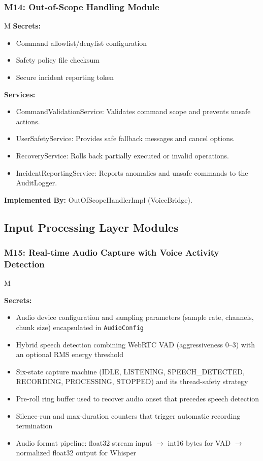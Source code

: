\documentclass[12pt, titlepage]{article}
\newcounter{mnum}
\newcommand{\mthemnum}{M\themnum}
\begin{document}
\subsubsection*{M14: Out-of-Scope Handling Module} \mthemnum\label{m14}
\textbf{Secrets:}
\begin{itemize}
  \item Command allowlist/denylist configuration
  \item Safety policy file checksum
  \item Secure incident reporting token
\end{itemize}
\textbf{Services:}
\begin{itemize}
  \item CommandValidationService: Validates command scope and prevents unsafe actions.
  \item UserSafetyService: Provides safe fallback messages and cancel options.
  \item RecoveryService: Rolls back partially executed or invalid operations.
  \item IncidentReportingService: Reports anomalies and unsafe commands to the AuditLogger.
\end{itemize}
\textbf{Implemented By:} OutOfScopeHandlerImpl (VoiceBridge).

\subsection*{Input Processing Layer Modules}

\subsubsection*{M15: Real-time Audio Capture with Voice Activity Detection} \mthemnum\label{m15}

\textbf{Secrets:}
\begin{itemize}
  \item Audio device configuration and sampling parameters (sample rate, channels, chunk size) encapsulated in \texttt{AudioConfig}
  \item Hybrid speech detection combining WebRTC VAD (aggressiveness 0--3) with an optional RMS energy threshold
  \item Six-state capture machine (IDLE, LISTENING, SPEECH\_DETECTED, RECORDING, PROCESSING, STOPPED) and its thread-safety strategy
  \item Pre-roll ring buffer used to recover audio onset that precedes speech detection
  \item Silence-run and max-duration counters that trigger automatic recording termination
  \item Audio format pipeline: float32 stream input $\to$ int16 bytes for VAD $\to$ normalized float32 output for Whisper
\end{itemize}
\end{document}
